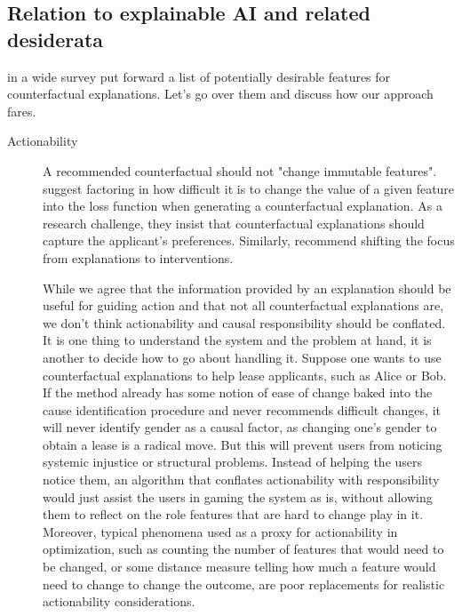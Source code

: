 \documentclass{article}
\begin{document}
\subsection{Relation to explainable AI and related desiderata}





\cite{verma2022recourses} in a wide survey put forward a list of potentially desirable features for counterfactual explanations. Let's go over them and discuss how our approach fares.

\begin{description}
    \item[Actionability] A recommended counterfactual should not "change immutable features". \cite{verma2022recourses} suggest factoring in how difficult it is to change the value of a given feature into the loss function when generating a counterfactual explanation. As a research challenge, they insist that counterfactual explanations should capture the applicant’s preferences.  Similarly, \cite{Karimi2021} recommend  shifting the focus from explanations to interventions.

    While we agree that the information provided by an explanation should be useful for guiding action and that not all counterfactual explanations are, we don't think actionability and causal responsibility should be conflated. It is one thing to understand the system and the problem at hand, it is another to decide how to go about handling it. Suppose one wants to use counterfactual explanations to help lease applicants, such as Alice or Bob. If the method already has some notion of ease of change baked into the cause identification procedure and never recommends difficult changes, it will never identify gender as a causal factor, as changing one's gender to obtain a lease is a radical move. But this will prevent users from noticing systemic injustice or structural problems. Instead of helping the users notice them, an algorithm that conflates actionability with responsibility would just assist the users in gaming the system as is, without allowing them to reflect on the role features that are hard to change play in it. Moreover, typical phenomena used as a proxy for actionability in optimization, such as counting the number of features that would need to be changed, or some distance measure telling how much a feature would need to change to change the outcome, are poor replacements for realistic actionability considerations. 


\end{description}
\end{document}
